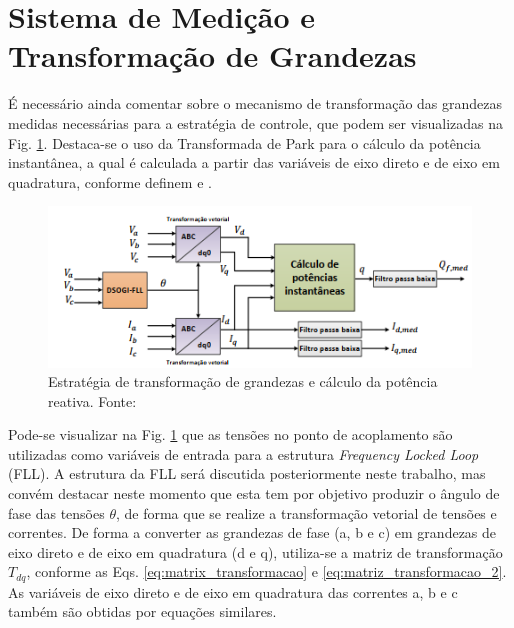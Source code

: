 \section{Sistema de Medição e Transformação de Grandezas}

É necessário ainda comentar sobre o mecanismo de transformação das grandezas medidas necessárias para a estratégia de controle, que podem ser visualizadas na Fig. \ref{fig:Estrategia_Grandezas}. Destaca-se o uso da Transformada de Park para o cálculo da potência instantânea, a qual é calculada a partir das variáveis de eixo direto e de eixo em quadratura, conforme definem \cite{book-remusteodorescu201b1} e \cite{book-hirofumiakagi2007}.

\begin{figure}[!hbt]
	\begin{center}
		\includegraphics[width=\columnwidth]{figuras/Transformacao_Grandezas.PNG}
		\caption{Estratégia de transformação de grandezas e cálculo da potência reativa. Fonte: \cite{TeseProfAlex}}
		\label{fig:Estrategia_Grandezas}
	\end{center}
\end{figure}

Pode-se visualizar na Fig. \ref{fig:Estrategia_Grandezas} que as tensões no ponto de acoplamento são utilizadas como variáveis de entrada para a estrutura \textit{Frequency Locked Loop} (FLL). A estrutura da FLL será discutida posteriormente neste trabalho, mas convém destacar neste momento que esta tem por objetivo produzir o ângulo de fase das tensões $\theta $, de forma que se realize a transformação vetorial de tensões e correntes. De forma a converter as grandezas de fase (a, b e c) em grandezas de eixo direto e de eixo em quadratura (d e q), utiliza-se a matriz de transformação $T_{dq}$, conforme as Eqs. \ref{eq:matrix_transformacao} e \ref{eq:matriz_transformacao_2}. As variáveis de eixo direto e de eixo em quadratura das correntes a, b e c também são obtidas por equações similares.

